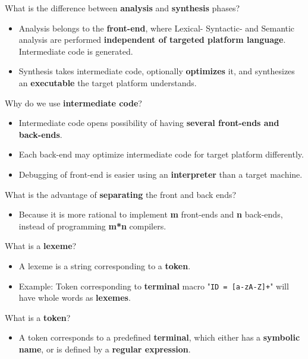 \documentclass[11pt]{beamer}
\begin{document}
\begin{frame}
\begin{block}{What is the difference between \textbf{analysis} and \textbf{synthesis} phases?}
\begin{itemize}
\item Analysis belongs to the \textbf{front-end}, where Lexical- Syntactic- and Semantic analysis are performed \textbf{independent of targeted platform language}. Intermediate code is generated.
\item Synthesis takes intermediate code, optionally \textbf{optimizes} it, and synthesizes an \textbf{executable} the target platform understands.
\end{itemize}
\end{block}

\begin{block}{Why do we use \textbf{intermediate code}? }
\begin{itemize}
\item Intermediate code opens possibility of having \textbf{several front-ends and back-ends}.
\item Each back-end may optimize intermediate code for target platform differently.
\item Debugging of front-end is easier using an \textbf{interpreter} than a target machine.
\end{itemize}
\end{block}
\end{frame}

\begin{frame}

\begin{block}{What is the advantage of \textbf{separating} the front and back ends? }
\begin{itemize}
\item Because it is more rational to implement \textbf{m} front-ends and \textbf{n} back-ends, instead of programming \textbf{m*n} compilers.
\end{itemize}
\end{block}

\begin{block}{What is a \textbf{lexeme}?}
\begin{itemize}
\item A lexeme is a string corresponding to a \textbf{token}.
\item Example: Token corresponding to \textbf{terminal} macro "\texttt{ID = [a-zA-Z]+}" will have whole words as \textbf{lexemes}.
\end{itemize}
\end{block}

\begin{block}{What is a \textbf{token}?}
\begin{itemize}
\item A token corresponds to a predefined \textbf{terminal}, which either has a \textbf{symbolic name}, or is defined by a \textbf{regular expression}.
\end{itemize}
\end{block}

\end{frame}
\end{document}
